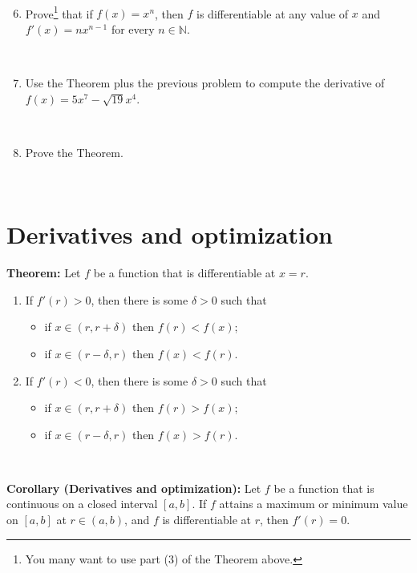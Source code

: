 \documentclass[12pt]{amsart}
\newcommand{\N}{\mathbb{N}}
\begin{document}
 \
 
 \begin{enumerate}\setcounter{enumi}{5}
 \item Prove\footnote{You many want to use part (3) of the Theorem above.} that if $f(x)=x^n$, then $f$ is differentiable at any value of $x$ and $f'(x) = n x^{n-1}$ for every $n\in \N$.
 
 \
 
 \item Use the Theorem plus the previous problem to compute the derivative of $f(x) = 5x^7 - \sqrt{19} x^4$.
 
 \
 
 \item Prove the Theorem.
 
 \
 
 \end{enumerate}
 
 \newpage
 
	\section*{Derivatives and optimization}


 
 \begin{framed} 
 \noindent \textbf{Theorem:} Let $f$ be a function that is differentiable at $x=r$.
 \begin{enumerate}
 \item 
 If $f'(r) > 0$, then there is some $\delta>0$ such that 
 \begin{itemize}
 \item if $x\in (r,r+\delta)$ then $f(r) < f(x)$;
  \item if $x\in (r-\delta,r)$ then $f(x) < f(r)$.
  \end{itemize}
  
  \item  If $f'(r) < 0$, then there is some $\delta>0$ such that 
  \begin{itemize}
 \item if $x\in (r,r+\delta)$ then $f(r) > f(x)$;
 \item if $x\in (r-\delta,r)$ then $f(x) > f(r)$.
  \end{itemize}
  \end{enumerate}
  
  \
  
  \noindent \textbf{Corollary (Derivatives and optimization):}
  Let $f$ be a function that is continuous on a closed interval $[a,b]$. If $f$ attains a maximum or minimum value on $[a,b]$ at $r\in (a,b)$, and $f$ is differentiable at $r$, then $f'(r)=0$.
  
 \end{framed}
 
\end{document}
